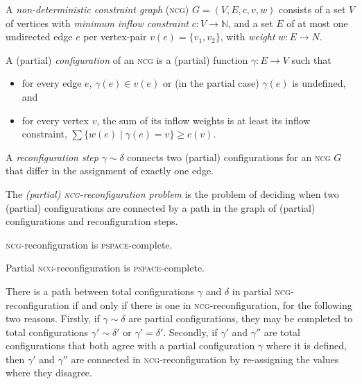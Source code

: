 \documentclass[conference]{IEEEtran}
\begin{document}
\begin{definition} 
A \emph{non-deterministic constraint graph} (\textsc{ncg}) $G=(V,E,c,v,w)$ consists of a set $V$ of vertices with \emph{minimum inflow constraint} $c\colon V\to\mathbb N$, and a set $E$ of at most one undirected edge $e$ per vertex-pair $v(e)=\{v_1,v_2\}$, with \emph{weight} $w\colon E\to N$.

A (partial) \emph{configuration} of an \textsc{ncg} is a (partial) function $\gamma\colon E\to V$ such that
\begin{itemize}
	\item
for every edge $e$, $\gamma(e)\in v(e)$ or (in the partial case) $\gamma(e)$ is undefined, and
	\item
for every vertex $v$, the sum of its inflow weights is at least its inflow constraint, $\sum\{w(e)\mid \gamma(e)=v\}\geq c(v)$.
\end{itemize} 

A \emph{reconfiguration step} $\gamma\sim\delta$ connects two (partial) configurations for an \textsc{ncg} $G$ that differ in the assignment of exactly one edge.

\end{definition}


The \emph{(partial) \textsc{ncg}-reconfiguration problem} is the problem of deciding when two (partial) configurations are connected by a path in the graph of (partial) configurations and reconfiguration steps.

\begin{theorem}
\textsc{ncg}-reconfiguration is \textsc{pspace}-complete.
\end{theorem}

\begin{proposition}
Partial \textsc{ncg}-reconfiguration is \textsc{pspace}-complete.
\end{proposition}

\begin{IEEEproof}
There is a path between total configurations $\gamma$ and $\delta$ in partial \textsc{ncg}-reconfiguration if and only if there is one in \textsc{ncg}-reconfiguration, for the following two reasons.
%
Firstly, if $\gamma\sim\delta$ are partial configurations, they may be completed to total configurations $\gamma'\sim\delta'$ or $\gamma'=\delta'$.
%
Secondly, if $\gamma'$ and $\gamma''$ are total configurations that both agree with a partial configuration $\gamma$ where it is defined, then $\gamma'$ and $\gamma''$ are connected in \textsc{ncg}-reconfiguration by re-assigning the values where they disagree.
%
\end{IEEEproof}
\end{document}
